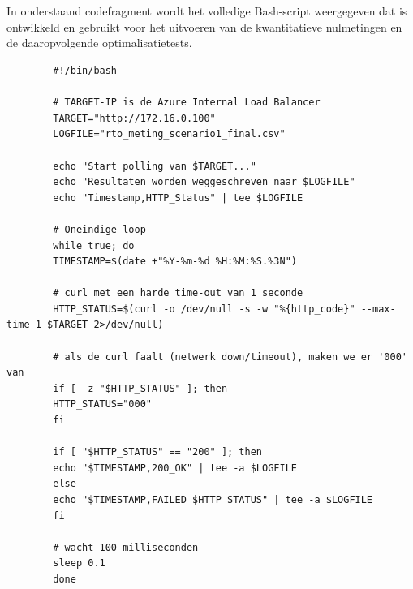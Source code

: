 \section{}
\label{app:rto_script}

In onderstaand codefragment wordt het volledige Bash-script weergegeven dat is ontwikkeld en gebruikt voor het uitvoeren van de kwantitatieve nulmetingen en de daaropvolgende optimalisatietests.

\begin{listing}[H]
    \begin{verbatim}
        #!/bin/bash
        
        # TARGET-IP is de Azure Internal Load Balancer
        TARGET="http://172.16.0.100"
        LOGFILE="rto_meting_scenario1_final.csv"
        
        echo "Start polling van $TARGET..."
        echo "Resultaten worden weggeschreven naar $LOGFILE"
        echo "Timestamp,HTTP_Status" | tee $LOGFILE
        
        # Oneindige loop
        while true; do
        TIMESTAMP=$(date +"%Y-%m-%d %H:%M:%S.%3N")
        
        # curl met een harde time-out van 1 seconde
        HTTP_STATUS=$(curl -o /dev/null -s -w "%{http_code}" --max-time 1 $TARGET 2>/dev/null)
        
        # als de curl faalt (netwerk down/timeout), maken we er '000' van
        if [ -z "$HTTP_STATUS" ]; then
        HTTP_STATUS="000"
        fi
        
        if [ "$HTTP_STATUS" == "200" ]; then
        echo "$TIMESTAMP,200_OK" | tee -a $LOGFILE
        else
        echo "$TIMESTAMP,FAILED_$HTTP_STATUS" | tee -a $LOGFILE
        fi
        
        # wacht 100 milliseconden
        sleep 0.1
        done
    \end{verbatim}
    \caption{Het volledige \texttt{rto\_monitor.sh} script.}
    \label{lst:rto_full_script}
\end{listing}